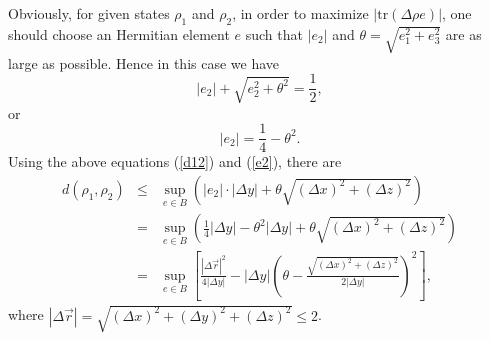 \documentclass[a4paper,11pt]{article}
\begin{document}
Obviously, for given states $\rho_1$ and $\rho_2$, in order to maximize $|
\mathrm{tr} (\Delta \rho   e) |$, one should choose an Hermitian
element $e$ such that $|e_2 |$ and $\theta = \sqrt{e_1^2 + e_3^2}$ are as
large as possible. Hence in this case we have
\begin{equation}
  |e_2 | + \sqrt{e_2^2 + \theta^2} = \frac{1}{2},
\end{equation}
or
\begin{equation}\label{e2}
  |e_2 | = \frac{1}{4} - \theta^2 .
\end{equation}
Using the above equations (\ref{d12}) and (\ref{e2}), there are
\begin{eqnarray}
  d (\rho_1, \rho_2) & \leqslant & \sup_{e \in B} \left( |e_2 | \cdot | \Delta
  y| + \theta \sqrt{(\Delta x)^2 + (\Delta z)^2} \right) \nonumber\\
  & = & \sup_{e \in B} \left( \frac{1}{4 } | \Delta y| - 
  \theta^2 | \Delta y| + \theta \sqrt{(\Delta x)^2 + (\Delta z)^2} \right)
  \nonumber\\
  & = & \sup_{e \in B} \left[ \frac{| \Delta \vec{r} |^2}{4 | \Delta
  y|} - | \Delta y| \left( \theta - \frac{\sqrt{(\Delta x)^2 +
  (\Delta z)^2}}{2 | \Delta y|} \right)^2 \right], 
\end{eqnarray}
where $| \Delta \vec{r} | = \sqrt{(\Delta x)^2 + (\Delta y)^2 + (\Delta z)^2}
\leqslant 2$.
\end{document}

